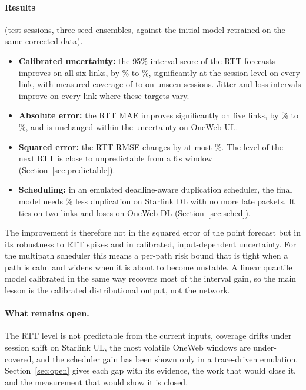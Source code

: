 \paragraph{Results} (test sessions, three-seed ensembles, against the initial model retrained on the same corrected data).
\begin{itemize}[leftmargin=*]
  \item \textbf{Calibrated uncertainty:} the 95\% interval score of the RTT forecasts improves on all six links, by \BSISWorstAbs\% to \BSISBestAbs\%, significantly at the session level on every link, with measured coverage of \PICPEnsMin{} to \PICPEnsMax{} on unseen sessions. Jitter and loss intervals improve on every link where these targets vary.
  \item \textbf{Absolute error:} the RTT MAE improves significantly on five links, by \BSMAEsigLoAbs\% to \BSMAEsigHiAbs\%, and is unchanged within the uncertainty on OneWeb UL.
  \item \textbf{Squared error:} the RTT RMSE changes by at most \BSRMSEMaxAbs\%. The level of the next RTT is close to unpredictable from a 6\,s window (Section~\ref{sec:predictable}).
  \item \textbf{Scheduling:} in an emulated deadline-aware duplication scheduler, the final model needs \SchedSaveSLDL\% less duplication on Starlink DL with no more late packets. It ties on two links and loses on OneWeb DL (Section~\ref{sec:sched}).
\end{itemize}
The improvement is therefore not in the squared error of the point forecast but in its robustness to RTT spikes and in calibrated, input-dependent uncertainty. For the multipath scheduler this means a per-path risk bound that is tight when a path is calm and widens when it is about to become unstable. A linear quantile model calibrated in the same way recovers most of the interval gain, so the main lesson is the calibrated distributional output, not the network.

\paragraph{What remains open.} The RTT level is not predictable from the current inputs, coverage drifts under session shift on Starlink UL, the most volatile OneWeb windows are under-covered, and the scheduler gain has been shown only in a trace-driven emulation. Section~\ref{sec:open} gives each gap with its evidence, the work that would close it, and the measurement that would show it is closed.
